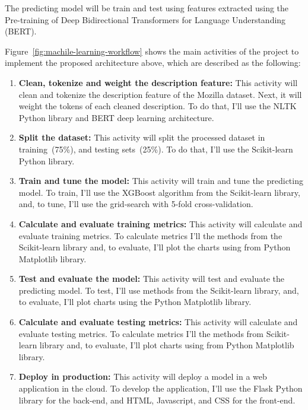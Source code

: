 \documentclass[a4paper]{article}
\begin{document}
The predicting model will be train and test using features extracted using the Pre-training of Deep Bidirectional Transformers for Language Understanding (BERT)\cite{devlin:2019}.

\bigskip
Figure~\ref{fig:machile-learning-workflow} shows the main activities of the project to implement the proposed architecture above, which are described as the following:

\begin{enumerate}
    \item {\bf Clean, tokenize and weight the description feature:} This activity will clean and tokenize the description feature of the Mozilla dataset. Next, it will weight the tokens of each cleaned description. To do that, I'll use the NLTK Python library and BERT deep learning architecture. 
    
    \item {\bf Split the dataset:} This activity will split the processed dataset in training~(75\%), and testing sets~(25\%). To do that, I'll use the Scikit-learn Python library. 
    
    \item {\bf Train and tune the model:} This activity will train and tune the predicting model. To train, I'll use the XGBoost algorithm from the Scikit-learn library, and, to tune, I'll use the grid-search with 5-fold cross-validation.
    
    \item {\bf Calculate and evaluate training metrics:} This activity will calculate and evaluate training metrics. To calculate metrics I'll the methods from the Scikit-learn library and, to evaluate, I'll plot the charts using from Python Matplotlib library.
    
    \item {\bf Test and evaluate the model:} This activity will test and evaluate the predicting model. To test, I'll use methods from the Scikit-learn library, and, to evaluate, I'll plot charts using the Python Matplotlib library.
    
    \item {\bf Calculate and evaluate testing metrics:} This activity will calculate and evaluate testing metrics. To calculate metrics I'll the methods from Scikit-learn library and, to evaluate, I'll plot charts using from Python Matplotlib library.
    
    \item {\bf Deploy in production:} This activity will deploy a model in a web application in the cloud. To develop the application, I'll use the Flask Python library for the back-end, and HTML, Javascript, and CSS for the front-end.
    
\end{enumerate}
\end{document}
